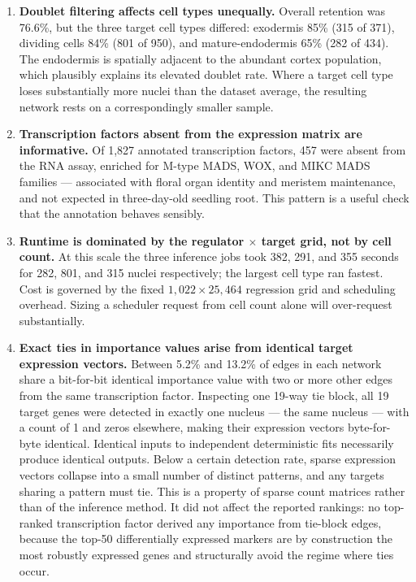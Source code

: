 \begin{enumerate}[leftmargin=*]

\item \textbf{Doublet filtering affects cell types unequally.} Overall retention was 76.6\%, but the three target cell types differed: exodermis 85\% (315 of 371), dividing cells 84\% (801 of 950), and mature-endodermis 65\% (282 of 434). The endodermis is spatially adjacent to the abundant cortex population, which plausibly explains its elevated doublet rate. Where a target cell type loses substantially more nuclei than the dataset average, the resulting network rests on a correspondingly smaller sample.

\item \textbf{Transcription factors absent from the expression matrix are informative.} Of 1,827 annotated transcription factors, 457 were absent from the RNA assay, enriched for M-type MADS, WOX, and MIKC MADS families --- associated with floral organ identity and meristem maintenance, and not expected in three-day-old seedling root. This pattern is a useful check that the annotation behaves sensibly.

\item \textbf{Runtime is dominated by the regulator $\times$ target grid, not by cell count.} At this scale the three inference jobs took 382, 291, and 355 seconds for 282, 801, and 315 nuclei respectively; the largest cell type ran fastest. Cost is governed by the fixed $1{,}022 \times 25{,}464$ regression grid and scheduling overhead. Sizing a scheduler request from cell count alone will over-request substantially.

\item \textbf{Exact ties in importance values arise from identical target expression vectors.} Between 5.2\% and 13.2\% of edges in each network share a bit-for-bit identical importance value with two or more other edges from the same transcription factor. Inspecting one 19-way tie block, all 19 target genes were detected in exactly one nucleus --- the same nucleus --- with a count of 1 and zeros elsewhere, making their expression vectors byte-for-byte identical. Identical inputs to independent deterministic fits necessarily produce identical outputs. Below a certain detection rate, sparse expression vectors collapse into a small number of distinct patterns, and any targets sharing a pattern must tie. This is a property of sparse count matrices rather than of the inference method. It did not affect the reported rankings: no top-ranked transcription factor derived any importance from tie-block edges, because the top-50 differentially expressed markers are by construction the most robustly expressed genes and structurally avoid the regime where ties occur.


\end{enumerate}

